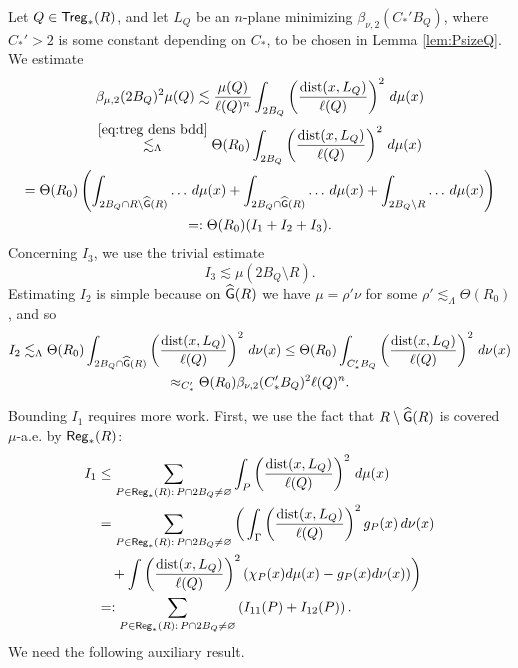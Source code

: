 Let $Q\in{\mathsf{Treg}}_*(R)$, and let $L_Q$ be an $n$-plane minimizing $\beta_{\nu,2}(C_*'B_Q)$, where $C_*'>2$ is some constant depending on $C_*$, to be chosen in Lemma \ref{lem:PsizeQ}. We estimate
\begin{multline}\label{eq:bet1}
\beta_{\mu,2}(2B_Q)^2\mu(Q)\lesssim \frac{\mu(Q)}{\ell(Q)^n}\int_{2B_Q} \left(\frac{{\rm dist}(x,L_Q)}{\ell(Q)}\right)^2\,d\mu(x)\\
\overset{\eqref{eq:treg dens bdd}}{\lesssim_\Lambda}\Theta(R_0)\int_{2B_Q} \left(\frac{{\rm dist}(x,L_Q)}{\ell(Q)}\right)^2\,d\mu(x)\\
= \Theta(R_0)\left(\int_{2B_Q\cap R\setminus {\widehat{{\mathsf G}}}(R)}\dots\,d\mu(x) + \int_{2B_Q\cap{\widehat{{\mathsf G}}}(R)} \dots\,d\mu(x) + \int_{2B_Q\setminus R} \dots\,d\mu(x)\right)\\
=:\Theta(R_0)(I_1+I_2+I_3).
\end{multline}
Concerning $I_3$, we use the trivial estimate
\begin{equation}\label{eq:bet2}
I_3\lesssim\mu(2B_Q\setminus R).
\end{equation}
Estimating $I_2$ is simple because on ${\widehat{{\mathsf G}}}(R)$ we have $\mu=\rho'\nu$ for some $\rho'\lesssim_{\Lambda} \Theta(R_0)$, and so
\begin{multline}\label{eq:bet3}
I_2 \lesssim_{\Lambda} \Theta(R_0)\int_{2B_Q\cap{\widehat{{\mathsf G}}}(R)} \left(\frac{{\rm dist}(x,L_Q)}{\ell(Q)}\right)^2\,d\nu(x)\le \Theta(R_0)\int_{C_*'B_Q} \left(\frac{{\rm dist}(x,L_Q)}{\ell(Q)}\right)^2\,d\nu(x)\\
\approx_{C_*'} \Theta(R_0)\beta_{\nu,2}(C_*'B_Q)^2\ell(Q)^n.
\end{multline}

Bounding $I_1$ requires more work. First, we use the fact that $R\setminus{\widehat{{\mathsf G}}}(R)$ is covered $\mu$-a.e. by ${\mathsf{Reg}}_*(R)$:
\begin{align*}
I_1 &\le \sum_{P\in{\mathsf{Reg}}_*(R) :\,  P\cap 2B_Q\neq\varnothing} \int_{P} \left(\frac{{\rm dist}(x,L_Q)}{\ell(Q)}\right)^2\,d\mu(x) \\
&= \sum_{P\in{\mathsf{Reg}}_*(R) :\,  P\cap 2B_Q\neq\varnothing} 
\bigg(\int_{\Gamma} \left(\frac{{\rm dist}(x,L_Q)}{\ell(Q)}\right)^2 g_P(x)\,d\nu(x)\\
&\quad+ \int \left(\frac{{\rm dist}(x,L_Q)}{\ell(Q)}\right)^2 (\chi_{P}(x)d\mu(x) - g_P(x)d\nu(x))\bigg)
\\
&=: \sum_{P\in{\mathsf{Reg}}_*(R) :\,  P\cap 2B_Q\neq\varnothing} \left(I_{11}(P) + I_{12}(P)\right).
\end{align*}
We need the following auxiliary result.

